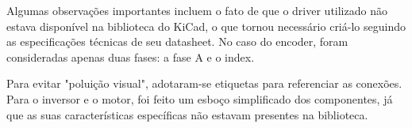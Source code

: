 Algumas observações importantes incluem o fato de que o driver utilizado não estava disponível na biblioteca do KiCad, o que tornou necessário criá-lo seguindo as especificações técnicas de seu datasheet. No caso do encoder, foram consideradas apenas duas fases: a fase A e o index.

Para evitar "poluição visual", adotaram-se etiquetas para referenciar as conexões. Para o inversor e o motor, foi feito um esboço simplificado dos componentes, já que as suas características específicas não estavam presentes na biblioteca.


